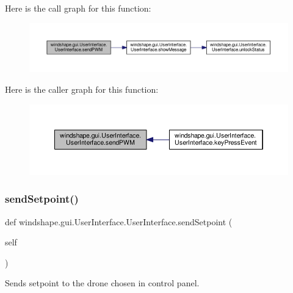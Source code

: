 Here is the call graph for this function\+:\nopagebreak
\begin{figure}[H]
\begin{center}
\leavevmode
\includegraphics[width=350pt]{classwindshape_1_1gui_1_1_user_interface_1_1_user_interface_a4e188b0f5fbd942b9fdc57e24363f46e_cgraph}
\end{center}
\end{figure}
Here is the caller graph for this function\+:\nopagebreak
\begin{figure}[H]
\begin{center}
\leavevmode
\includegraphics[width=350pt]{classwindshape_1_1gui_1_1_user_interface_1_1_user_interface_a4e188b0f5fbd942b9fdc57e24363f46e_icgraph}
\end{center}
\end{figure}
\mbox{\label{classwindshape_1_1gui_1_1_user_interface_1_1_user_interface_ae1b487f3e6f38aa3429588bb885ef2d7}} 
\subsubsection{\texorpdfstring{send\+Setpoint()}{sendSetpoint()}}
{\footnotesize\ttfamily def windshape.\+gui.\+User\+Interface.\+User\+Interface.\+send\+Setpoint (\begin{DoxyParamCaption}\item[{}]{self }\end{DoxyParamCaption})}

\begin{DoxyVerb}Sends setpoint to the drone chosen in control panel.\end{DoxyVerb}
 

